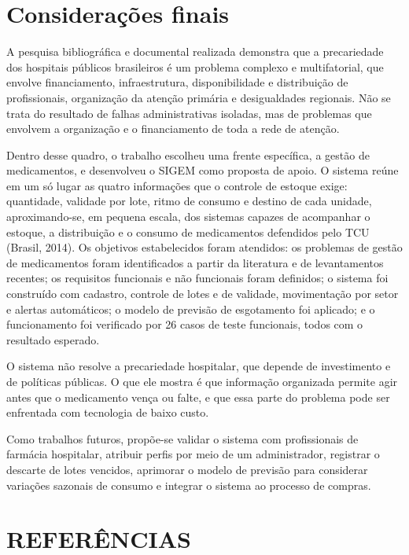 \documentclass[12pt,a4paper]{article}
\begin{document}
\FloatBarrier
\section{Considerações finais}

A pesquisa bibliográfica e documental realizada demonstra que a precariedade dos hospitais públicos brasileiros é um problema complexo e multifatorial, que envolve financiamento, infraestrutura, disponibilidade e distribuição de profissionais, organização da atenção primária e desigualdades regionais. Não se trata do resultado de falhas administrativas isoladas, mas de problemas que envolvem a organização e o financiamento de toda a rede de atenção.

Dentro desse quadro, o trabalho escolheu uma frente específica, a gestão de medicamentos, e desenvolveu o SIGEM como proposta de apoio. O sistema reúne em um só lugar as quatro informações que o controle de estoque exige: quantidade, validade por lote, ritmo de consumo e destino de cada unidade, aproximando-se, em pequena escala, dos sistemas capazes de acompanhar o estoque, a distribuição e o consumo de medicamentos defendidos pelo TCU (Brasil, 2014). Os objetivos estabelecidos foram atendidos: os problemas de gestão de medicamentos foram identificados a partir da literatura e de levantamentos recentes; os requisitos funcionais e não funcionais foram definidos; o sistema foi construído com cadastro, controle de lotes e de validade, movimentação por setor e alertas automáticos; o modelo de previsão de esgotamento foi aplicado; e o funcionamento foi verificado por 26 casos de teste funcionais, todos com o resultado esperado.

O sistema não resolve a precariedade hospitalar, que depende de investimento e de políticas públicas. O que ele mostra é que informação organizada permite agir antes que o medicamento vença ou falte, e que essa parte do problema pode ser enfrentada com tecnologia de baixo custo.

Como trabalhos futuros, propõe-se validar o sistema com profissionais de farmácia hospitalar, atribuir perfis por meio de um administrador, registrar o descarte de lotes vencidos, aprimorar o modelo de previsão para considerar variações sazonais de consumo e integrar o sistema ao processo de compras.

\section*{REFERÊNCIAS}
\end{document}
